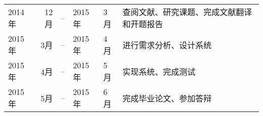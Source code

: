 
\begin{center}
\vspace{-20pt}
\vspace{-14pt}
\begin{longtable}{l r l l l l}
\label{tab:3} \\
\endfirsthead
\endhead
\endfoot
\endlastfoot

2014年 & 12月 & -- & 2015年 & 3月 & 查阅文献、研究课题、完成文献翻译和开题报告\\
2015年 & 3月 & -- & 2015年 & 4月 & 进行需求分析、设计系统\\
2015年 & 4月 & -- & 2015年 & 5月 & 实现系统、完成测试\\
2015年 & 5月 & -- & 2015年 & 6月 & 完成毕业论文、参加答辩\\
\end{longtable}
\end{center}
